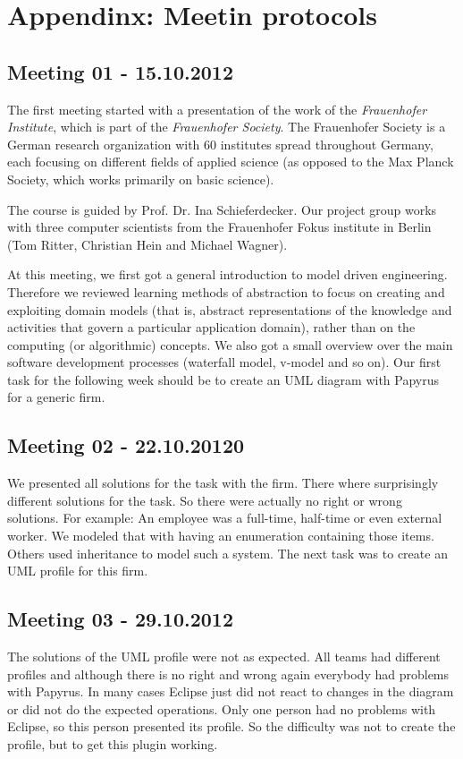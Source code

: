 \appendix
\chapter{Appendinx: Meetin protocols} \label{sec:appendix}

\section{Meeting 01 - 15.10.2012}
The first meeting started with a presentation of the work of the \emph{Frauenhofer Institute}, which is part of the \emph{Frauenhofer Society}. The Frauenhofer Society is a German research organization with $60$ institutes spread throughout Germany, each focusing on different fields of applied science (as opposed to the Max Planck Society, which works primarily on basic science).

The course is guided by Prof. Dr. Ina Schieferdecker. Our project group works with three computer scientists from the Frauenhofer Fokus institute in Berlin (Tom Ritter, Christian Hein and Michael Wagner).

At this meeting, we first got a general introduction to model driven engineering. Therefore we reviewed learning methods of abstraction to focus on creating and exploiting domain models (that is, abstract representations of the knowledge and activities that govern a particular application domain), rather than on the computing (or algorithmic) concepts. We also got a small overview over the main software development processes (waterfall model, v-model and so on). Our first task for the following week should be to create an UML diagram with Papyrus for a generic firm.

\section{Meeting 02 - 22.10.20120}
We presented all solutions for the task with the firm. There where surprisingly different solutions for the task. So there were actually no right or wrong solutions. For example: An employee was a full-time, half-time or even external worker. We modeled that with having an enumeration containing those items. Others used inheritance to model such a system. The next task was to create an UML profile for this firm.

\section{Meeting 03 - 29.10.2012}
The solutions of the UML profile were not as expected. All teams had different profiles and although there is no right and wrong again everybody had problems with Papyrus. In many cases Eclipse just did not react to changes in the diagram or did not do the expected operations. Only one person had no problems with Eclipse, so this person presented its profile. So the difficulty was not to create the profile, but to get this plugin working.


